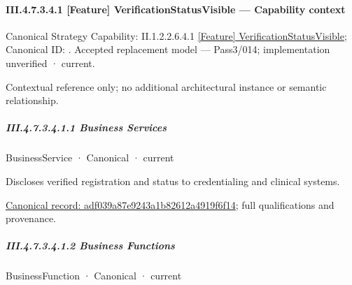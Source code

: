 \paragraph*{III.4.7.3.4.1 [Feature] VerificationStatusVisible — Capability context}
\label{navigation:III.4.7.3.4.1}

{\small Canonical Strategy Capability: II.1.2.2.6.4.1 \hyperref[element:2275144b93364b2ca3f2368b69e1ce80]{[Feature] VerificationStatusVisible}; Canonical ID: \texttt{}. Accepted replacement model — Pass3/014; implementation unverified · current.}\par
Contextual reference only; no additional architectural instance or semantic relationship.\par
\subparagraph*{III.4.7.3.4.1.1 Business Services}
\label{navigation:III.4.7.3.4.1.1}

\label{navigation:III.4.7.3.4.1.1.1}

\label{element:adf039a87e9243a1b82612a4919f6f14}
{\small BusinessService · Canonical · current}\par

Discloses verified registration and status to credentialing and clinical systems.


{\footnotesize \href{../../../../../../../continuum/business/business-service/adf039a87e9243a1b82612a4919f6f14.md}{Canonical record: adf039a87e9243a1b82612a4919f6f14}; full qualifications and provenance.}\par
\subparagraph*{III.4.7.3.4.1.2 Business Functions}
\label{navigation:III.4.7.3.4.1.2}

\label{navigation:III.4.7.3.4.1.2.1}

\label{element:a9f4fe6090bf4a4b946ae7064213945c}
{\small BusinessFunction · Canonical · current}\par

